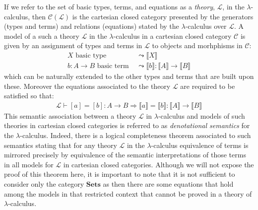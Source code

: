 If we refer to the set of basic types, terms, and equations as a \emph{theory}, $\mathcal{L}$, in the $\lambda$-calculus, then $\mathcal{C}(\mathcal{L})$ is the cartesian closed category presented by the generators (types and terms) and relations (equations) stated by the $\lambda$-calculus over $\mathcal{L}$. A model of a such a theory $\mathcal{L}$ in the $\lambda$-calculus in a cartesian closed category $\mathcal{C}$ is given by an assignment of types and terms in $\mathcal{L}$ to objects and morhphisms in $\mathcal{C}$:
\begin{align*}
X \mbox{ basic type } &\leadsto \llbracket X \rrbracket\\
b \colon A \rightarrow B \mbox{ basic term } &\leadsto \llbracket b \rrbracket \colon \llbracket A \rrbracket \rightarrow \llbracket B \rrbracket
\end{align*}
which can be naturally extended to the other types and terms that are built upon these. Moreover the equations associated to the theory $\mathcal{L}$ are required to be satisfied so that:
\begin{align*}
\mathcal{L} \vdash [a]=[b] \colon A \rightarrow B \Longrightarrow \llbracket a \rrbracket = \llbracket b \rrbracket \colon \llbracket A \rrbracket \rightarrow \llbracket B \rrbracket
\end{align*}
This semantic association between a theory $\mathcal{L}$ in $\lambda$-calculus and models of such theories in cartesian closed categories is referred to as \emph{denotational semantics} for the $\lambda$-calculus. Indeed, there is a logical completeness theorem associated to such semantics stating that for any theory $\mathcal{L}$ in the $\lambda$-calculus equivalence of terms is mirrored precisely by equivalence of the semantic interpretations of those terms in all models for $\mathcal{L}$ in cartesian closed categories. Although we will not expose the proof of this theorem here, it is important to note that it is not sufficient to consider only the category $\mathbf{Sets}$ as then there are some equations that hold among the models in that restricted context that cannot be proved in a theory of $\lambda$-calculus.
